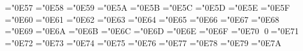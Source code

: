 \mathchardef\LeftTeeVector ="0E57
\let\mLeftTeeVector=\LeftTeeVector 
\mathchardef\DownLeftTeeVector ="0E58
\let\mDownLeftTeeVector=\DownLeftTeeVector 
\mathchardef\RightUpTeeVector ="0E59
\let\mRightUpTeeVector=\RightUpTeeVector 
\mathchardef\LeftUpTeeVector ="0E5A
\let\mLeftUpTeeVector=\LeftUpTeeVector 
\mathchardef\RightDownTeeVector ="0E5B
\let\mRightDownTeeVector=\RightDownTeeVector 
\mathchardef\LeftDownTeeVector ="0E5C
\let\mLeftDownTeeVector=\LeftDownTeeVector 
\mathchardef\LeftDoubleBracket ="0E5D
\let\mLeftDoubleBracket=\LeftDoubleBracket 
\mathchardef\RightDoubleBracket ="0E5E
\let\mRightDoubleBracket=\RightDoubleBracket 
\mathchardef\langle ="0E5F
\let\mLeftAngleBracket=\langle 
\mathchardef\rangle ="0E60
\let\mRightAngleBracket=\rangle 
\mathchardef\lfloor ="0E61
\let\mLeftFloor=\lfloor 
\mathchardef\rfloor ="0E62
\let\mRightFloor=\rfloor 
\mathchardef\lceil ="0E63
\let\mLeftCeiling=\lceil 
\mathchardef\rceil ="0E64
\let\mRightCeiling=\rceil 
\mathchardef\LeftBracketingBar ="0E65
\let\mLeftBracketingBar=\LeftBracketingBar 
\mathchardef\RightBracketingBar ="0E66
\let\mRightBracketingBar=\RightBracketingBar 
\mathchardef\LeftDoubleBracketingBar ="0E67
\let\mLeftDoubleBracketingBar=\LeftDoubleBracketingBar 
\mathchardef\RightDoubleBracketingBar ="0E68
\let\mRightDoubleBracketingBar=\RightDoubleBracketingBar 
\mathchardef\DottedSquare ="0E69
\let\mDottedSquare=\DottedSquare 
\mathchardef\circ ="0E6A
\let\mEmptySmallCircle=\circ 
\mathchardef\FilledSmallCircle ="0E6B
\let\mFilledSmallCircle=\FilledSmallCircle 
\mathchardef\bigcirc ="0E6C
\let\mEmptyCircle=\bigcirc 
\mathchardef\FilledCircle ="0E6D
\let\mFilledCircle=\FilledCircle 
\mathchardef\EmptyDiamond ="0E6E
\let\mEmptyDiamond=\EmptyDiamond 
\mathchardef\blacklozenge ="0E6F
\let\mFilledDiamond=\blacklozenge 
\mathchardef\EmptyRectangle ="0E70
\let\mEmptyRectangle=\EmptyRectangle 
\mathchardef\qed ="0E71
\let\mFilledRectangle=\qed 
\mathchardef\EmptySquare ="0E72
\let\mEmptySquare=\EmptySquare 
\mathchardef\EmptySmallSquare ="0E73
\let\mEmptySmallSquare=\EmptySmallSquare 
\mathchardef\EmptyVerySmallSquare ="0E74
\let\mEmptyVerySmallSquare=\EmptyVerySmallSquare 
\mathchardef\FilledSquare ="0E75
\let\mFilledSquare=\FilledSquare 
\mathchardef\FilledSmallSquare ="0E76
\let\mFilledSmallSquare=\FilledSmallSquare 
\mathchardef\FilledVerySmallSquare ="0E77
\let\mFilledVerySmallSquare=\FilledVerySmallSquare 
\mathchardef\triangle ="0E78
\let\mEmptyUpTriangle=\triangle 
\mathchardef\FilledUpTriangle ="0E79
\let\mFilledUpTriangle=\FilledUpTriangle 
\mathchardef\FilledRightTriangle ="0E7A
\let\mFilledRightTriangle=\FilledRightTriangle 
